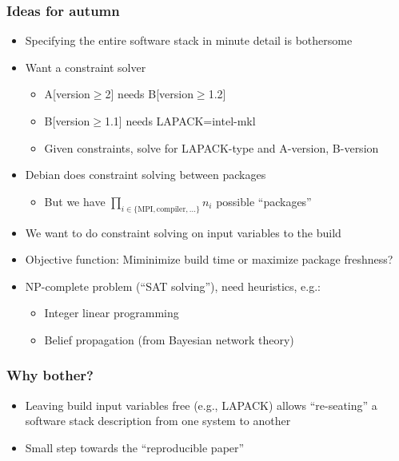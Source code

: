 \documentclass[sans,mathserif]{beamer}
\begin{document}
\begin{frame}
  \frametitle{Ideas for autumn}

  \begin{itemize}
  \item<+-> Specifying the entire software stack in minute detail is bothersome
  \item<+-> Want a constraint solver
    \begin{itemize}
    \item A[version$\ge$2] needs B[version$\ge$1.2]
    \item B[version$\ge$1.1] needs LAPACK=intel-mkl
    \item Given constraints, solve for LAPACK-type and A-version, B-version
    \end{itemize}
  \item<+-> Debian does constraint solving between packages
    \begin{itemize}
    \item But we have $\prod_{i\in\{\text{MPI},\text{compiler},...\}} n_i$ possible ``packages''
    \end{itemize}
  \item<+-> We want to do constraint solving on input variables to the build
  \item<+-> Objective function: Miminimize build time or maximize package freshness?
  \item<+-> NP-complete problem (``SAT solving''), need heuristics, e.g.:
    \begin{itemize}
    \item Integer linear programming
    \item Belief propagation (from Bayesian network theory)
    \end{itemize}
  \end{itemize}

\end{frame}

\begin{frame}
  \frametitle{Why bother?}

  \begin{itemize}
  \item<+-> Leaving build input variables free (e.g., LAPACK)
    allows ``re-seating'' a software stack description from one system
    to another
  \item<+-> Small step towards the ``reproducible paper''
  \end{itemize}
\end{frame}
\end{document}

